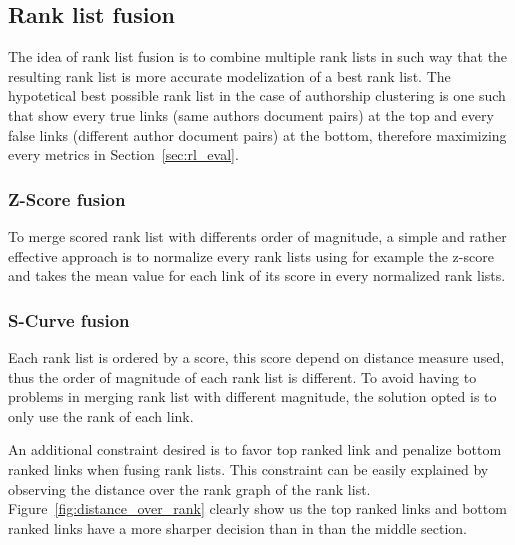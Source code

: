 \subsection{Rank list fusion}
\label{sec:rank_list_fusion}

The idea of rank list fusion is to combine multiple rank lists in such way that the resulting rank list is more accurate modelization of a best rank list.
The hypotetical best possible rank list in the case of authorship clustering is one such that show every true links (same authors document pairs) at the top and every false links (different author document pairs) at the bottom, therefore maximizing every metrics in Section~\ref{sec:rl_eval}.

\subsubsection{Z-Score fusion}

To merge scored rank list with differents order of magnitude, a simple and rather effective approach is to normalize every rank lists using for example the z-score and takes the mean value for each link of its score in every normalized rank lists.

\subsubsection{S-Curve fusion}

Each rank list is ordered by a score, this score depend on distance measure used, thus the order of magnitude of each rank list is different.
To avoid having to problems in merging rank list with different magnitude, the solution opted is to only use the rank of each link.

An additional constraint desired is to favor top ranked link and penalize bottom ranked links when fusing rank lists.
This constraint can be easily explained by observing the distance over the rank graph of the rank list.
Figure~\ref{fig:distance_over_rank} clearly show us the top ranked links and bottom ranked links have a more sharper decision than in than the middle section.

